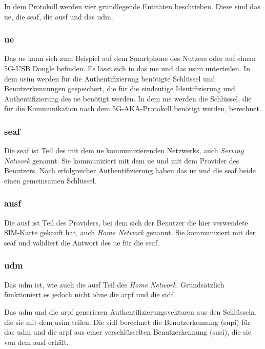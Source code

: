 In dem Protokoll werden vier grundlegende Entitäten beschrieben.
Diese sind das \gls{ue}, die \gls{seaf}, die \gls{ausf} und das \gls{udm}.

\subsubsection{\gls{ue}}

Das \gls{ue} kann sich zum Beispiel auf dem Smartphone des Nutzers oder auf einem 5G-USB Dongle befinden.
Es lässt sich in das \gls{me} und das \gls{usim} unterteilen.
In dem \gls{usim} werden für die Authentifizierung benötigte Schlüssel und Benutzerkennungen gespeichert, die für die eindeutige Identifizierung und Authentifizierung des \gls{ue} benötigt werden. %
In dem \gls{me} werden die Schlüssel, die für die Kommunikation nach dem 5G-AKA-Protokoll benötigt werden, berechnet.

\subsubsection{\gls{seaf}}

Die \gls{seaf} ist Teil des mit dem \gls{ue} kommunizierenden Netzwerks, auch \textit{Serving Network} genannt.
Sie kommuniziert mit dem \gls{ue} und mit dem Provider des Benutzers.
Nach erfolgreicher Authentifizierung haben das \gls{ue} und die \gls{seaf} beide einen gemeinsamen Schlüssel.%

\subsubsection{\gls{ausf}}

Die \gls{ausf} ist Teil des Providers, bei dem sich der Benutzer die hier verwendete SIM-Karte gekauft hat, auch \textit{Home Network} genannt.
Sie kommuniziert mit der \gls{seaf} und validiert die Antwort des \gls{ue} für die \gls{seaf}.

\subsubsection{\gls{udm}}

Das \gls{udm} ist, wie auch die \gls{ausf} Teil des \textit{Home Network}.
Grundsätzlich funktioniert es jedoch nicht ohne die \gls{arpf} und die \gls{sidf}.

Das \gls{udm} und die \gls{arpf} generieren Authentifizierungsvektoren aus den Schlüsseln, die sie mit dem \gls{usim} teilen.
Die \gls{sidf} berechnet die Benutzerkennung (\gls{supi}) für das \gls{udm} und die \gls{arpf} aus einer verschlüsselten Benutzerkennung (\gls{suci}), die sie von dem \gls{ausf} erhält.


